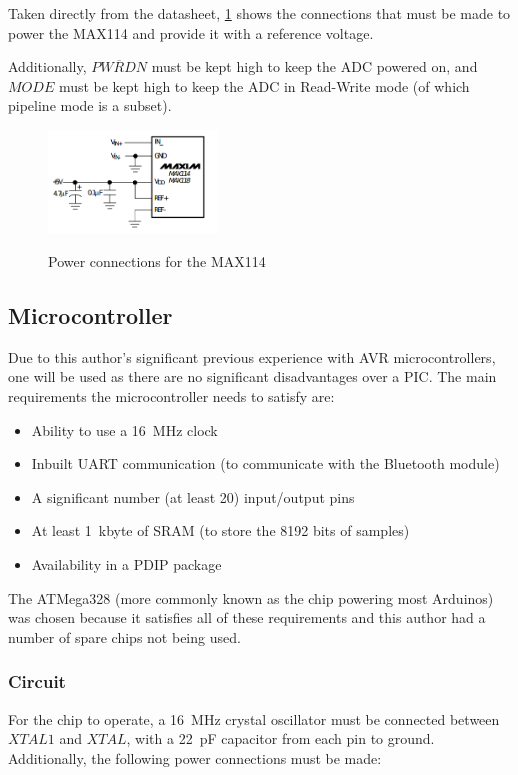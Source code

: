 Taken directly from the datasheet, \cref{fig:MAX114Power} shows the connections
that must be made to power the MAX114 and provide it with a reference voltage.

Additionally, $\overline{PWRDN}$ must be kept high to keep the ADC powered on,
and $MODE$ must be kept high to keep the ADC in Read-Write mode (of which
pipeline mode is a subset).

\begin{figure}
  \centering
  \includegraphics[width=0.4\textwidth]{img/adc/max114power.png}
  \label{fig:MAX114Power}
  \caption[ADC Power Connections]{Power connections for the MAX114~\autocite{MAX114}}
\end{figure}


\subsection{Microcontroller}

Due to this author's significant previous experience with AVR microcontrollers,
one will be used as there are no significant disadvantages over a PIC. The main
requirements the microcontroller needs to satisfy are:

\begin{itemize}
  \item Ability to use a \SI{16}{\MHz} clock
  \item Inbuilt UART communication (to communicate with the Bluetooth module)
  \item A significant number (at least 20) input/output pins
  \item At least \SI{1}{\kilo byte} of SRAM (to store the 8192 bits of samples)
  \item Availability in a PDIP package
\end{itemize}

The ATMega328 (more commonly known as the chip powering most Arduinos) was
chosen because it satisfies all of these requirements and this author had a
number of spare chips not being used.

\subsubsection{Circuit}
For the chip to operate, a \SI{16}{\MHz} crystal oscillator must be connected
between $XTAL1$ and $XTAL$, with a \SI{22}{\pF} capacitor from each pin to
ground. Additionally, the following power connections must be made:

